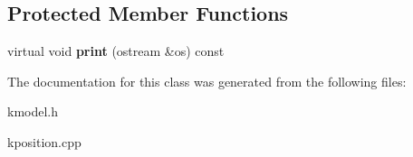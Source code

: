 \subsection*{Protected Member Functions}
\begin{DoxyCompactItemize}
\item 
\hypertarget{class_k_base_1_1_mtch_pstn_a6e7b76abf2a809ffdeabf599143f596e}{virtual void {\bfseries print} (ostream \&os) const }\label{class_k_base_1_1_mtch_pstn_a6e7b76abf2a809ffdeabf599143f596e}

\end{DoxyCompactItemize}


The documentation for this class was generated from the following files\-:\begin{DoxyCompactItemize}
\item 
kmodel.\-h\item 
kposition.\-cpp\end{DoxyCompactItemize}
